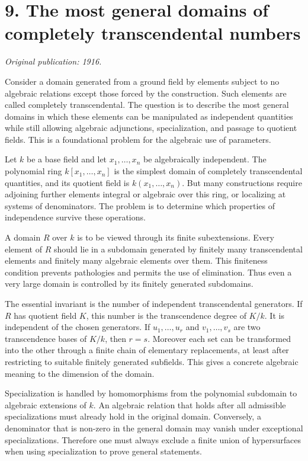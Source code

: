 \documentclass[11pt]{article}
\begin{document}
\section{9. The most general domains of completely transcendental numbers}

\textit{Original publication: 1916.}

Consider a domain generated from a ground field by elements subject to no algebraic relations except
those forced by the construction. Such elements are called completely transcendental. The question
is to describe the most general domains in which these elements can be manipulated as independent
quantities while still allowing algebraic adjunctions, specialization, and passage to quotient
fields. This is a foundational problem for the algebraic use of parameters.


Let \(k\) be a base field and let \(x_1, \ldots,x_n\) be algebraically independent. The polynomial
ring \(k[x_1, \ldots,x_n]\) is the simplest domain of completely transcendental quantities, and its
quotient field is \(k(x_1, \ldots,x_n)\). But many constructions require adjoining further elements
integral or algebraic over this ring, or localizing at systems of denominators. The problem is to
determine which properties of independence survive these operations.


A domain \(R\) over \(k\) is to be viewed through its finite subextensions. Every element of \(R\)
should lie in a subdomain generated by finitely many transcendental elements and finitely many
algebraic elements over them. This finiteness condition prevents pathologies and permits the use of
elimination. Thus even a very large domain is controlled by its finitely generated subdomains.


The essential invariant is the number of independent transcendental generators. If \(R\) has
quotient field \(K\), this number is the transcendence degree of \(K/k\). It is independent of the
chosen generators. If \(u_1, \ldots,u_r\) and \(v_1, \ldots,v_s\) are two transcendence bases of
\(K/k\), then \(r=s\). Moreover each set can be transformed into the other through a finite chain of
elementary replacements, at least after restricting to suitable finitely generated subfields. This
gives a concrete algebraic meaning to the dimension of the domain.


Specialization is handled by homomorphisms from the polynomial subdomain to algebraic extensions of
\(k\). An algebraic relation that holds after all admissible specializations must already hold in
the original domain. Conversely, a denominator that is non-zero in the general domain may vanish
under exceptional specializations. Therefore one must always exclude a finite union of hypersurfaces
when using specialization to prove general statements.
\end{document}
